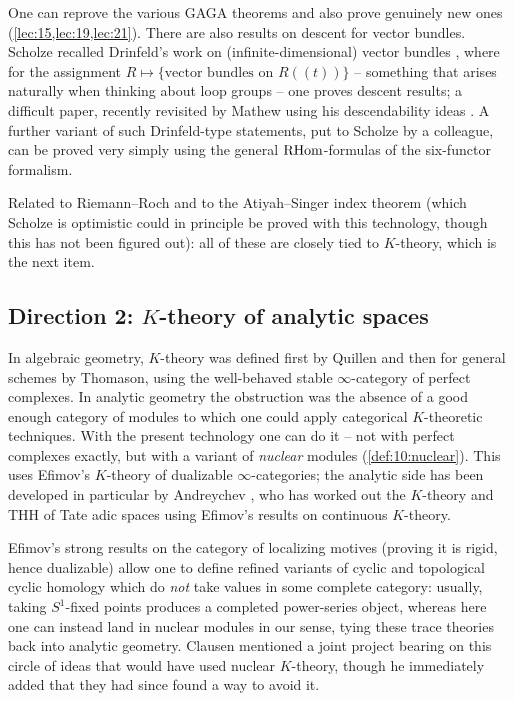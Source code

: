 \begin{remark}
\label{rmk:24:gaga-vb}
One can reprove the various GAGA theorems and also prove genuinely new ones
(\cref{lec:15,lec:19,lec:21}). There are also results on descent for vector
bundles. Scholze recalled Drinfeld's work on (infinite-dimensional) vector
bundles \cite{drinfeld2004infinitedimensionalvectorbundlesalgebraic}, where for
the assignment $R\mapsto\{\text{vector bundles on }R(\!(t)\!)\}$ -- something
that arises naturally when thinking about loop groups -- one proves descent
results; a difficult paper, recently revisited by Mathew using his
descendability ideas \cite{mathew2016galoisgroupstablehomotopy}. A further
variant of such Drinfeld-type statements, put to Scholze by a colleague, can be
proved very simply using the general $\mathrm{RHom}$-formulas of the six-functor
formalism.
\end{remark}

Related to Riemann--Roch and to the Atiyah--Singer index theorem (which Scholze
is optimistic could in principle be proved with this technology, though this has
not been figured out): all of these are closely tied to $K$-theory, which is the
next item.

\subsection{Direction 2: \texorpdfstring{$K$}{K}-theory of analytic spaces}
\label{subsec:24:k-theory}

In algebraic geometry, $K$-theory was defined first by Quillen and then for
general schemes by Thomason, using the well-behaved stable $\infty$-category of
perfect complexes. In analytic geometry the obstruction was the absence of a
good enough category of modules to which one could apply categorical
$K$-theoretic techniques. With the present technology one can do it -- not with
perfect complexes exactly, but with a variant of \emph{nuclear} modules
(\cref{def:10:nuclear}). This uses Efimov's $K$-theory of dualizable
$\infty$-categories; the analytic side has been developed in particular by
Andreychev \cite{andreychev2023ktheorieadischerraume}, who has
worked out the $K$-theory and THH of Tate adic spaces using Efimov's results on
continuous $K$-theory.

\begin{remark}
\label{rmk:24:localizing-motives}
Efimov's strong results on the category of localizing motives (proving it is
rigid, hence dualizable) allow one to define refined variants of cyclic and
topological cyclic homology which do \emph{not} take values in some complete
category: usually, taking $S^1$-fixed points produces a completed power-series
object, whereas here one can instead land in nuclear modules in our sense, tying
these trace theories back into analytic geometry. Clausen mentioned a joint
project bearing on this circle of ideas that would have used nuclear $K$-theory,
though he immediately added that they had since found a way to avoid it.
\end{remark}

